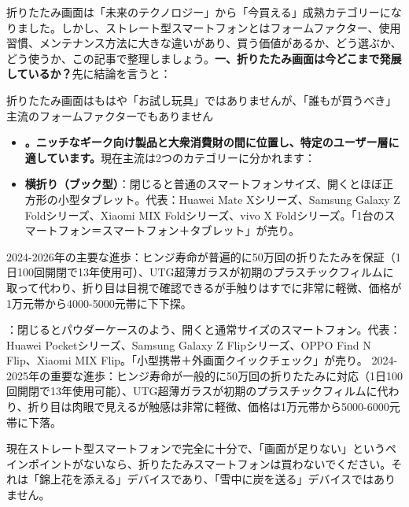 


折りたたみ画面は「未来のテクノロジー」から「今買える」成熟カテゴリーになりました。しかし、ストレート型スマートフォンとはフォームファクター、使用習慣、メンテナンス方法に大きな違いがあり、買う価値があるか、どう選ぶか、どう使うか、この記事で整理しましょう。\textbf{一、折りたたみ画面は今どこまで発展しているか？}先に結論を言うと：

折りたたみ画面はもはや「お試し玩具」ではありませんが、「誰もが買うべき」主流のフォームファクターでもありません

\begin{itemize}
  \item \textbf{。ニッチなギーク向け製品と大衆消費財の間に位置し、特定のユーザー層に適しています。}現在主流は2つのカテゴリーに分かれます：
  \item \textbf{横折り（ブック型）}：閉じると普通のスマートフォンサイズ、開くとほぼ正方形の小型タブレット。代表：Huawei Mate Xシリーズ、Samsung Galaxy Z Foldシリーズ、Xiaomi MIX Foldシリーズ、vivo X Foldシリーズ。「1台のスマートフォン＝スマートフォン＋タブレット」が売り。
\end{itemize}

2024-2026年の主要な進歩：ヒンジ寿命が普遍的に50万回の折りたたみを保証（1日100回開閉で13年使用可）、UTG超薄ガラスが初期のプラスチックフィルムに取って代わり、折り目は目視で確認できるが手触りはすでに非常に軽微、価格が1万元帯から4000-5000元帯に下下探。

\begin{tcbinfo}{：閉じるとパウダーケースのよう、開くと通常サイズのスマートフォン。代表：Huawei Pocketシリーズ、Samsung Galaxy Z Flipシリーズ、OPPO Find N Flip、Xiaomi MIX Flip。「小型携帯＋外画面クイックチェック」が売り。}
2024-2025年の重要な進歩：ヒンジ寿命が一般的に50万回の折りたたみに対応（1日100回開閉で13年使用可能）、UTG超薄ガラスが初期のプラスチックフィルムに代わり、折り目は肉眼で見えるが触感は非常に軽微、価格は1万元帯から5000-6000元帯に下落。

\end{tcbinfo}


現在ストレート型スマートフォンで完全に十分で、「画面が足りない」というペインポイントがないなら、折りたたみスマートフォンは買わないでください。それは「錦上花を添える」デバイスであり、「雪中に炭を送る」デバイスではありません。

